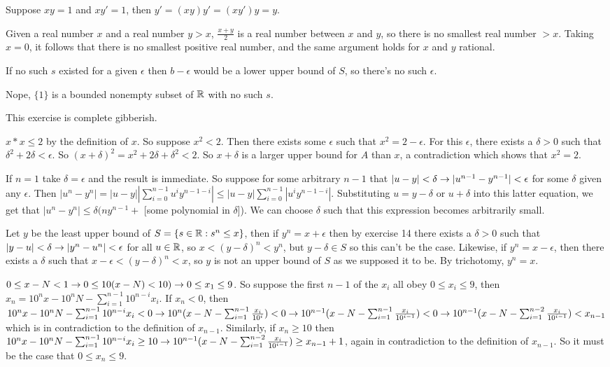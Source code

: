 \documentclass[11pt, oneside]{article}   	%
\begin{document}
\item Suppose $xy = 1$ and $xy' = 1$, then $y' = (xy)y' = (xy')y = y$.
\ee
\item Given a real number $x$ and a real number $y > x$, $\frac{x+y}{2}$ is a real number between $x$ and $y$, so there is no smallest real number $> x$. Taking $x=0$, it follows that there is no smallest positive real number, and the same argument holds for $x$ and $y$ rational.
\item \be
\item If no such $s$ existed for a given $\epsilon$ then $b - \epsilon$ would be a lower upper bound of $S$, so there's no such $\epsilon$.
\item Nope, $\{1\}$ is a bounded nonempty subset of $\mathbb{R}$ with no such $s$.
\item This exercise is complete gibberish. 
\ee
\item $x*x \le 2$ by the definition of $x$. So suppose $x^2 < 2$. Then there exists some $\epsilon$ such that $x^2= 2 - \epsilon$. For this $\epsilon$, there exists a $\delta > 0$ such that $\delta^2 + 2\delta < \epsilon$. So $(x + \delta)^2 = x^2 + 2\delta + \delta^2 < 2$. So $x+\delta$ is a larger upper bound for $A$ than $x$, a contradiction which shows that $x^2 = 2$.
\item If $n=1$ take $\delta = \epsilon$ and the result is immediate. So suppose for some arbitrary $n-1$ that $|u-y| < \delta \rightarrow |u^{n-1} - y^{n-1}| < \epsilon$ for some $\delta$ given any $\epsilon$. Then $|u^n - y^n| = |u-y||\sum_{i=0}^{n-1}u^iy^{n-1-i}| \le |u-y|\sum_{i=0}^{n-1}|u^iy^{n-1-i}|$. Substituting $u = y - \delta$ or $u + \delta$ into this latter equation, we get that $|u^n - y^n| \le \delta(ny^{n-1} +$ [some polynomial in $\delta$]). We can choose $\delta$ such that this expression becomes arbitrarily small.
\item Let $y$ be the least upper bound of $S = \{s \in \mathbb{R}: s^n \le x\}$, then if $y^n = x + \epsilon$ then by exercise 14 there exists a $\delta > 0$ such that $|y - u| < \delta \rightarrow |y^n - u^n| < \epsilon$ for all $u \in \mathbb{R}$, so $x < (y - \delta)^n < y^n$, but $y - \delta \in S$ so this can't be the case. Likewise, if $y^n = x -\epsilon$, then there exists a $\delta$ such that $x - \epsilon < (y - \delta)^n < x$, so $y$ is not an upper bound of $S$ as we supposed it to be. By trichotomy, $y^n = x$.
\item \be
\item $0 \le x - N < 1 \rightarrow 0 \le 10(x - N) < 10) \rightarrow 0 \le x_1 \le 9$. So suppose the first $n-1$ of the $x_i$ all obey $0 \le x_i \le 9$, then $x_n = 10^nx - 10^nN - \sum_{i=1}^{n-1}10^{n-i}x_i$. If $x_n < 0$, then $10^nx - 10^nN - \sum_{i=1}^{n-1}10^{n-i}x_i < 0 \rightarrow 10^{n}(x - N - \sum_{i=1}^{n-1}\frac{x_i}{10^i}) < 0 \rightarrow 10^{n-1}(x - N - \sum_{i=1}^{n-1}\frac{x_i}{10^{i-1}}) < 0 \rightarrow 10^{n-1}(x-N-\sum_{i=1}^{n-2}\frac{x_i}{10^{i-1}}) < x_{n-1}$ which is in contradiction to the definition of $x_{n-1}$. Similarly, if $x_n \ge 10$ then $10^nx - 10^nN - \sum_{i=1}^{n-1}10^{n-i}x_i \ge 10 \rightarrow 10^{n-1}(x-N-\sum_{i=1}^{n-2}\frac{x_i}{10^{i-1}}) \ge x_{n-1} + 1$, again in contradiction to the definition of $x_{n-1}$. So it must be the case that $0 \le x_n \le 9$. 
\end{document}
